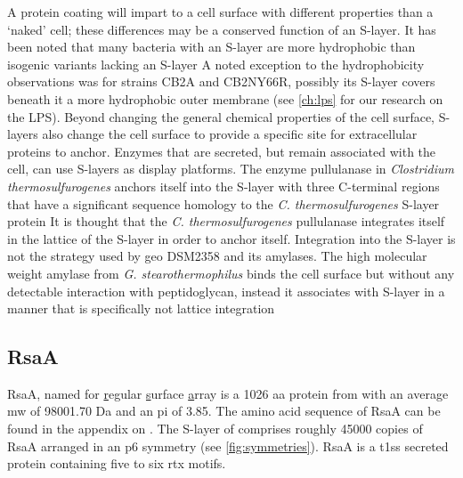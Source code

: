 A protein coating will impart to a cell surface with different properties than a `naked' cell; these differences may be a conserved function of an \ac{S-layer}. It has been noted
that many bacteria with an \ac{S-layer} are more hydrophobic than isogenic variants lacking an \ac{S-layer} A noted exception to the hydrophobicity
observations was for \caulobacter strains CB2A and CB2NY66R, possibly its \ac{S-layer} covers beneath it a more hydrophobic outer membrane (see \cref{ch:lps}
for our research on the \caulobacter \ac{LPS}). Beyond changing the general chemical properties of the cell surface, \acp{S-layer} also change the cell surface to provide a
specific site for extracellular proteins to anchor. Enzymes that are secreted, but remain associated with the cell, can use \acp{S-layer} as display platforms. The enzyme
pullulanase in \textit{Clostridium thermosulfurogenes} anchors itself into the \ac{S-layer} with three C-terminal regions that have a significant sequence homology to the
\textit{C. thermosulfurogenes} \ac{S-layer} protein It is thought that the \textit{C. thermosulfurogenes} pullulanase integrates itself in the
lattice of the \ac{S-layer} in order to anchor itself. Integration into the \ac{S-layer} is not the strategy used by \ac{geo} DSM2358 and its amylases. The high molecular weight
amylase from \textit{G. stearothermophilus} binds the cell surface but without any detectable interaction with peptidoglycan, instead it associates with \ac{S-layer} in a manner
that is specifically not lattice integration


\subsection{RsaA} \label{sec:intro-rsaa}

RsaA, named for \underline{r}egular \underline{s}urface \underline{a}rray is a 1026 \ac{aa} protein from \caulobacter with an average \ac{mw}
of 98001.70 Da and an \ac{pi} of 3.85. The amino acid sequence of RsaA can be found in the appendix on . The \ac{S-layer} of \caulobacter comprises roughly
45000 copies of RsaA arranged in an p6 symmetry (see \cref{fig:symmetries}). RsaA is a \ac{t1ss} secreted protein containing five to six \ac{rtx} motifs.

